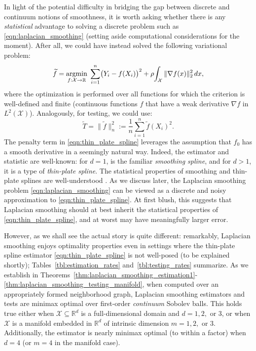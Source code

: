\documentclass[twoside]{article}
\newcommand{\Reals}{\mathbb{R}}
\newcommand{\1}{\mathbf{1}}
\DeclareMathOperator*{\argmin}{argmin}
\newcommand{\Rd}{\Reals^d}
\newcommand{\Xset}{\mathcal{X}}
\newcommand{\wt}[1]{\widetilde{#1}}
\newcommand{\wh}[1]{\widehat{#1}}
\theoremstyle{definition}
\theoremstyle{remark}
\begin{document}
In light of the potential difficulty in bridging the gap between discrete and continuum notions of smoothness, it is worth asking whether there is any \emph{statistical} advantage to solving a discrete problem such as \eqref{eqn:laplacian_smoothing} (setting aside computational considerations for the moment). After all, we could have instead solved the following variational problem:
\begin{equation}
\label{eqn:thin_plate_spline}
\wt{f} = \argmin_{f : \Xset \to \Reals} \; \sum_{i = 1}^{n} \bigl(Y_i - f(X_i)\bigr)^2 + \rho \hspace{-2pt} \int_{\Xset} \|\nabla f(x)\|_2^2 \,dx,
\end{equation}
where the optimization is performed over all functions for which the criterion is well-defined and finite (continuous functions $f$ that have a weak derivative $\nabla f$ in $L^2(\Xset)$). Analogously, for testing, we could use:
\begin{equation}
\label{eqn:thin_plate_spline_test}
\wt{T} = \| \wt{f} \|_n^2 := \frac{1}{n} \sum_{i=1}^n \wt{f}(X_i)^2.
\end{equation}
The penalty term in \eqref{eqn:thin_plate_spline} leverages the assumption that $f_0$ has a smooth derivative in a seemingly natural way. Indeed, the estimator \smash{$\wt{f}$} and statistic \smash{$\wt{T}$} are well-known: for $d = 1$, \smash{$\wt{f}$} is the familiar \emph{smoothing spline}, and for $d>1$, it is a type of \emph{thin-plate spline}. The statistical properties of smoothing and thin-plate splines are well-understood \citep{vandergeer2000,liu2019}. As we discuss later, the Laplacian smoothing problem \eqref{eqn:laplacian_smoothing} can be viewed as a discrete and noisy approximation to \eqref{eqn:thin_plate_spline}. At first blush, this suggests that Laplacian smoothing should at best inherit the statistical properties of \eqref{eqn:thin_plate_spline}, and at worst may have meaningfully larger error.

However, as we shall see the actual story is quite different: remarkably, Laplacian smoothing enjoys optimality properties even in settings where the thin-plate spline estimator \eqref{eqn:thin_plate_spline} is not well-posed (to be explained shortly); Tables~\ref{tbl:estimation_rates} and~\ref{tbl:testing_rates} summarize. As we establish in Theorems~\ref{thm:laplacian_smoothing_estimation1}-\ref{thm:laplacian_smoothing_testing_manifold}, when computed over an appropriately formed neighborhood graph, Laplacian smoothing estimators and tests are minimax optimal over first-order \emph{continuum} Sobolev balls. This holds true either when $\Xset \subseteq \Rd$ is a full-dimensional domain and $d = 1,2,$ or $3$, or when $\Xset$ is a manifold embedded in $\Rd$ of intrinsic dimension $m = 1,2,$ or $3$. Additionally, the estimator \smash{$\wh{f}$} is nearly minimax optimal (to within a  factor) when $d=4$ (or $m=4$ in the manifold case). 
\end{document}
